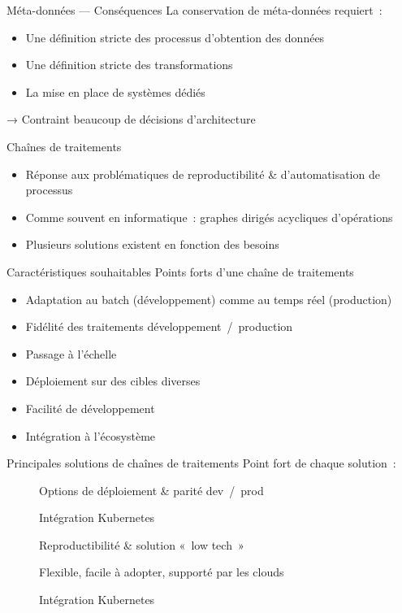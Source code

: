 \begin{frame}{Méta-données — Conséquences}
  La conservation de méta-données requiert~:

  \begin{itemize}
    \item Une définition stricte des processus d'obtention des données
    \item Une définition stricte des transformations
    \item La mise en place de systèmes dédiés
  \end{itemize}

  → Contraint beaucoup de décisions d'architecture
\end{frame}

\begin{frame}{Chaînes de traitements}
  \begin{itemize}
    \item Réponse aux problématiques de reproductibilité \& d'automatisation de processus
    \item Comme souvent en informatique~: graphes dirigés acycliques d'opérations
    \item Plusieurs solutions existent en fonction des besoins
  \end{itemize}
\end{frame}

\begin{frame}{Caractéristiques souhaitables}
  Points forts d'une chaîne de traitements
  \begin{itemize}
    \item Adaptation au batch (développement) comme au temps réel (production)
    \item Fidélité des traitements développement~/~production
    \item Passage à l'échelle
    \item Déploiement sur des cibles diverses
    \item Facilité de développement
    \item Intégration à l'écosystème
  \end{itemize}
\end{frame}

\begin{frame}{Principales solutions de chaînes de traitements}
  Point fort de chaque solution~:

  \begin{description}
    \item[] Options de déploiement \& parité dev~/~prod
    \item[] Intégration Kubernetes
    \item[] Reproductibilité \& solution «~low tech~»
    \item[] Flexible, facile à adopter, supporté par les clouds
    \item[] Intégration Kubernetes
  \end{description}
\end{frame}
